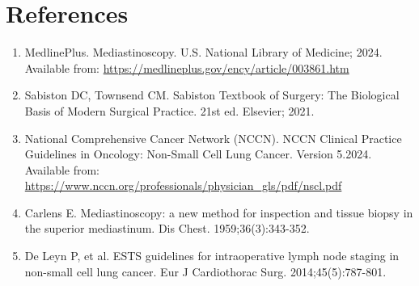 \section*{References}
\begin{enumerate}
  \item MedlinePlus. Mediastinoscopy. U.S. National Library of Medicine; 2024. Available from: \url{https://medlineplus.gov/ency/article/003861.htm}
  \item Sabiston DC, Townsend CM. Sabiston Textbook of Surgery: The Biological Basis of Modern Surgical Practice. 21st ed. Elsevier; 2021.
  \item National Comprehensive Cancer Network (NCCN). NCCN Clinical Practice Guidelines in Oncology: Non-Small Cell Lung Cancer. Version 5.2024. Available from: \url{https://www.nccn.org/professionals/physician_gls/pdf/nscl.pdf}
  \item Carlens E. Mediastinoscopy: a new method for inspection and tissue biopsy in the superior mediastinum. Dis Chest. 1959;36(3):343-352.
  \item De Leyn P, et al. ESTS guidelines for intraoperative lymph node staging in non-small cell lung cancer. Eur J Cardiothorac Surg. 2014;45(5):787-801.
\end{enumerate}

\clearpage
